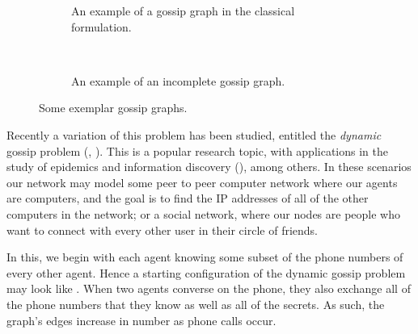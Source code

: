 \documentclass[10pt, a4paper]{report}
\begin{document}
\begin{figure}[h]
  \centering
  \begin{subfigure}[c]{0.4\textwidth}
    \centering
    \caption{An example of a gossip graph in the classical formulation.}
    \label{fig:classicgossipex}
  \end{subfigure}%
  ~
  \begin{subfigure}[c] {0.4\textwidth}
    \centering
    \caption{An example of an incomplete gossip graph. }
    \label{fig:dynamicgossipex}

  \end{subfigure}
  \caption{Some exemplar gossip graphs.}
\end{figure}

Recently a variation of this problem has been studied, entitled the
\emph{dynamic} gossip problem (\cite{DynamicGossip}, \cite{EpProforDyGo}). This
is a popular research topic, with applications in the study of epidemics and
information discovery (\cite{DiscoverythruGossip}), among others. In these
scenarios our network may model some peer to peer computer network where our
agents are computers, and the goal is to find the IP addresses of all of the
other computers in the network; or a social network, where our nodes are people
who want to connect with every other user in their circle of friends.

In this, we begin with each agent knowing some subset of the phone
numbers of every other agent. Hence a starting configuration of the dynamic
gossip problem may look like . When two agents
converse on the phone, they also exchange all of the phone numbers that they
know as well as all of the secrets. As such, the graph's edges increase in
number as phone calls occur.
\end{document}
